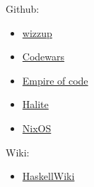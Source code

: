 \documentclass{minimal}
\begin{document}
Github:

\begin{itemize}
  \item \href{https://github.com/wizzup}{wizzup}
  \item \href{https://github.com/Codewars/codewars-runner-cli/commits?author=wizzup}{Codewars}
  \item \href{https://github.com/Empire-of-Code-Puzzles/checkio-empire-dailies-reports/commits?author=wizzup}{Empire of code}
  \item \href{https://github.com/HaliteChallenge/Halite/commits?author=wizzup}{Halite}
  \item \href{https://github.com/NixOS/nixpkgs/commits?author=wizzup}{NixOS}
\end{itemize}

Wiki:
\begin{itemize}
  \item \href{https://wiki.haskell.org/Special:Contributions/Wizzup}{HaskellWiki}
\end{itemize}
\end{document}
